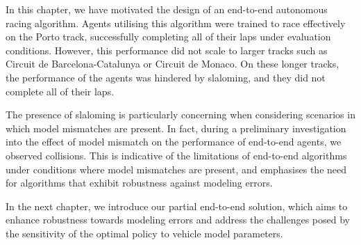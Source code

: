 In this chapter, we have motivated the design of an end-to-end autonomous racing algorithm.
Agents utilising this algorithm were trained to race effectively on the Porto track, successfully completing all of their laps under evaluation conditions.
However, this performance did not scale to larger tracks such as Circuit de Barcelona-Catalunya or Circuit de Monaco.
On these longer tracks, the performance of the agents was hindered by slaloming, and they did not complete all of their laps.

The presence of slaloming is particularly concerning when considering scenarios in which model mismatches are present.
In fact, during a preliminary investigation into the effect of model mismatch on the performance of end-to-end agents, we observed collisions.
This is indicative of the limitations of end-to-end algorithms under conditions where model mismatches are present, and emphasises the need for algorithms that exhibit robustness against modeling errors.

In the next chapter, we introduce our partial end-to-end solution, which aims to enhance robustness towards modeling errors and address the challenges posed by the sensitivity of the optimal policy to vehicle model parameters.
